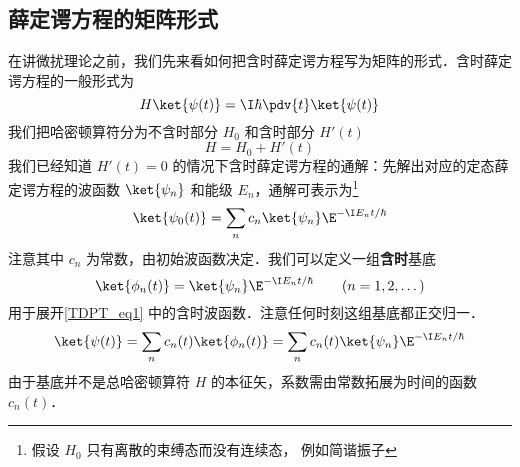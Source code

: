 

\subsection{薛定谔方程的矩阵形式}
在讲微扰理论之前，我们先来看如何把含时薛定谔方程写为矩阵的形式．含时薛定谔方程的一般形式为
\begin{equation}\label{TDPT_eq1}
H \ket{\psi(t)} = \I\hbar \pdv{t} \ket{\psi(t)}
\end{equation}
我们把哈密顿算符分为不含时部分 $H_0$ 和含时部分 $H'(t)$
\begin{equation}
H = H_0 + H'(t)
\end{equation}
我们已经知道 %
$H'(t) = 0$ 的情况下含时薛定谔方程的通解：先解出对应的定态薛定谔方程的波函数 $\ket{\psi_n}$ 和能级 $E_n$，通解可表示为\footnote{假设 $H_0$ 只有离散的束缚态而没有连续态， 例如简谐振子}
\begin{equation}
\ket{\psi_0(t)} = \sum_n c_n \ket{\psi_n} \E^{-\I E_n t/\hbar}
\end{equation}
注意其中 $c_n$ 为常数，由初始波函数决定．我们可以定义一组\textbf{含时}基底
\begin{equation}
\ket{\phi_n(t)} = \ket{\psi_n} \E^{-\I E_n t/\hbar} \qquad (n = 1, 2, \dots)
\end{equation}
用于展开\autoref{TDPT_eq1} 中的含时波函数．注意任何时刻这组基底都正交归一．
\begin{equation}
\ket{\psi(t)} = \sum_n c_n(t) \ket{\phi_n(t)} = \sum_n c_n(t) \ket{\psi_n} \E^{-\I E_n t/\hbar}
\end{equation}
由于基底并不是总哈密顿算符 $H$ 的本征矢，系数需由常数拓展为时间的函数 $c_n(t)$．

